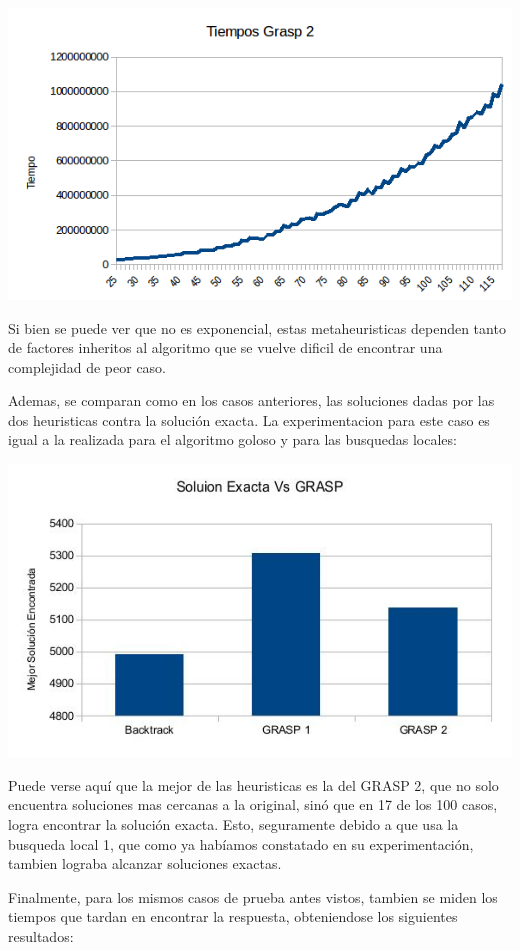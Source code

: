 \includegraphics[scale=0.5]{Ej5/tiempog2.png}

Si bien se puede ver que no es exponencial, estas metaheuristicas dependen tanto de factores inheritos al algoritmo que se vuelve dificil de encontrar una complejidad de peor caso.

Ademas, se comparan como en los casos anteriores, las soluciones dadas por las dos heuristicas contra la solución exacta. La experimentacion para este caso es igual a la realizada para el algoritmo goloso y para las busquedas locales:

\includegraphics[scale=0.5]{Ej5/graspSol.jpg}

Puede verse aquí que la mejor de las heuristicas es la del GRASP 2, que no solo encuentra soluciones mas cercanas a la original, sinó que en 17 de los 100 casos, logra encontrar la solución exacta. Esto, seguramente debido a que usa la busqueda local 1, que como ya habíamos constatado en su experimentación, tambien lograba alcanzar soluciones exactas.

Finalmente, para los mismos casos de prueba antes vistos, tambien se miden los tiempos que tardan en encontrar la respuesta, obteniendose los siguientes resultados:

